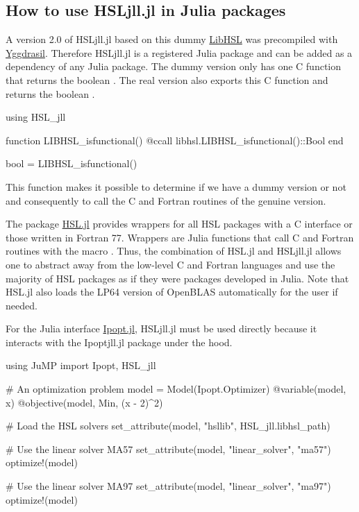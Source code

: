 \documentclass[gdweb]{geradwp}
\renewcommand{\_}{\raisebox{+0.35mm}{\textunderscore}}
\newcommand{\LibHSL}{LibHSL\xspace}
\newcommand{\HSLjll}{HSL\_jll.jl\xspace}
\newcommand{\Ipoptjll}{Ipopt\_jll.jl\xspace}
\begin{document}
\subsection{How to use \HSLjll in Julia packages}

A version 2.0 of \HSLjll based on this dummy \href{https://github.com/ralna/LibHSL}{\LibHSL} was precompiled with \href{https://github.com/JuliaPackaging/Yggdrasil}{Yggdrasil}.
Therefore \HSLjll is a registered Julia package and can be added as a dependency of any Julia package.
The dummy version only has one C function \jlinl{LIBHSL\_isfunctional} that returns the boolean .
The real version also exports this C function and returns the boolean .
\begin{jllisting}
using HSL_jll

function LIBHSL_isfunctional()
    @ccall libhsl.LIBHSL_isfunctional()::Bool
end

bool = LIBHSL_isfunctional()
\end{jllisting}
This function makes it possible to determine if we have a dummy version or not and consequently to call the C and Fortran routines of the genuine version.

The package \href{https://github.com/JuliaSmoothOptimizers/HSL.jl}{HSL.jl} provides wrappers for all HSL packages with a C interface or those written in Fortran 77.
Wrappers are Julia functions that call C and Fortran routines with the macro .
Thus, the combination of HSL.jl and \HSLjll allows one to abstract away from the low-level C and Fortran  languages and use the majority of HSL packages as if they were packages developed in Julia.
Note that HSL.jl also loads the LP64 version of OpenBLAS automatically for the user if needed.

For the Julia interface \href{https://github.com/jump-dev/Ipopt.jl}{Ipopt.jl}, \HSLjll must be used directly because it interacts with the \Ipoptjll package under the hood.

\begin{jllisting}
using JuMP
import Ipopt, HSL_jll

# An optimization problem
model = Model(Ipopt.Optimizer)
@variable(model, x)
@objective(model, Min, (x - 2)^2)

# Load the HSL solvers
set_attribute(model, "hsllib", HSL_jll.libhsl_path)

# Use the linear solver MA57
set_attribute(model, "linear_solver", "ma57")
optimize!(model)

# Use the linear solver MA97
set_attribute(model, "linear_solver", "ma97")
optimize!(model)
\end{jllisting}
\end{document}
